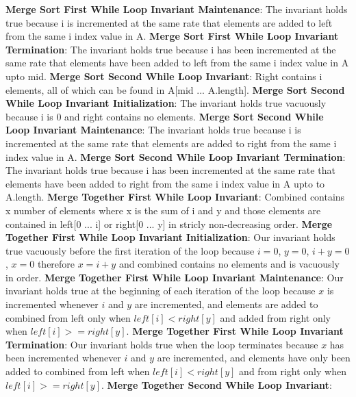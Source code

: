 \documentclass[onecolumn, 12pt, article]{IEEEtran}
\numberwithin{case}{problem}
\numberwithin{condition}{problem}
\numberwithin{condition}{subsection}
\numberwithin{definition}{section}
\theoremstyle{remark}
\numberwithin{question}{problem}
\theoremstyle{plain}
\numberwithin{answer}{problem}
\numberwithin{solution}{section}
\numberwithin{equation}{section}%
\begin{document}
\textbf{Merge Sort First While Loop Invariant Maintenance}: The invariant holds true because i is incremented at the same rate that elements are added to left from the same i index value in A.
\newline
\textbf{Merge Sort First While Loop Invariant Termination}: The invariant holds true because i has been incremented at the same rate that elements have been added to left from the same i index value in A upto mid.
\newline
\newline
\textbf{Merge Sort Second While Loop Invariant}: Right contains i elements, all of which can be found in A[mid ... A.length].
\newline
\textbf{Merge Sort Second While Loop Invariant Initialization}: The invariant holds true vacuously because i is 0 and right contains no elements.
\newline
\textbf{Merge Sort Second While Loop Invariant Maintenance}: The invariant holds true because i is incremented at the same rate that elements are added to right from the same i index value in A.
\newline
\textbf{Merge Sort Second While Loop Invariant Termination}: The invariant holds true because i has been incremented at the same rate that elements have been added to right from the same i index value in A upto to A.length.
\newline
\newline
\textbf{Merge Together First While Loop Invariant}: Combined contains x number of elements where x is the sum of i and y and those elements are contained in left[0 ... i] or right[0 ... y] in stricly non-decreasing order.
\newline
\textbf{Merge Together First While Loop Invariant Initialization}: Our invariant holds true vacuously before the first iteration of the loop because $i = 0$, $y = 0$, $i + y = 0$, $x = 0$ therefore $x = i + y$ and combined contains no elements and is vacuously in order.
\newline
\textbf{Merge Together First While Loop Invariant Maintenance}: Our invariant holds true at the beginning of each iteration of the loop because $x$ is incremented whenever $i$ and $y$ are incremented, and elements are added to combined from left only when $left[i] < right[y]$ and added from right only when $left[i] >= right[y]$.
\newline
\textbf{Merge Together First While Loop Invariant Termination}: Our invariant holds true when the loop terminates because $x$ has been incremented whenever $i$ and $y$ are incremented, and elements have only been added to combined from left when $left[i] < right[y]$ and from right only when $left[i] >= right[y]$.
\newline
\newline
\textbf{Merge Together Second While Loop Invariant}:
\end{document}
